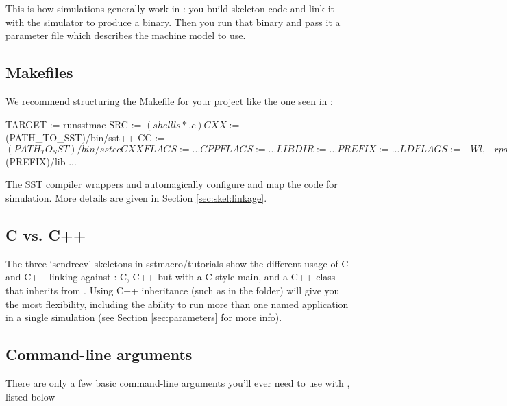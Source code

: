 This is how simulations generally work in \sstmacro: you build skeleton code and link it with the simulator to produce a binary.  
Then you run that binary and pass it a parameter file which describes the machine model to use.

\subsection{Makefiles}
\label{subsec:tutorial:makefiles}

We recommend structuring the Makefile for your project like the one seen in  :

\begin{ViFile}
TARGET := runsstmac
SRC := $(shell ls *.c) 

CXX :=      $(PATH_TO_SST)/bin/sst++
CC :=        $(PATH_TO_SST)/bin/sstcc
CXXFLAGS := ...
CPPFLAGS := ...
LIBDIR :=  ...
PREFIX :=   ...
LDFLAGS :=  -Wl,-rpath,$(PREFIX)/lib
...
\end{ViFile}
The SST compiler wrappers  and  automagically configure and map the code for simulation.  More details are given in Section \ref{sec:skel:linkage}.

\subsection{C vs. C++}
\label{subsec:tutorial:cprog}

The three `sendrecv' skeletons in sstmacro/tutorials show the 
different usage of C and C++ linking against \sstmacro: C, C++ but with a C-style main, and a C++ class that inherits from .   
Using C++ inheritance (such as in the  folder) will 
give you the most flexibility, including the ability to run more than one named application in a single simulation (see Section \ref{sec:parameters} for more info).  

\subsection{Command-line arguments}
\label{subsec:tutorial:cmdline}

There are only a few basic command-line arguments you'll ever need to use with \sstmacro, listed below

